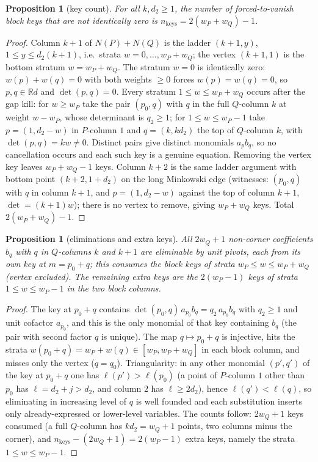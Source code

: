 \documentclass[11pt]{article}
\newtheorem{proposition}[theorem]{Proposition}
\theoremstyle{definition}
\theoremstyle{remark}
\begin{document}
\begin{proposition}[key count]\label{prop:A}
For all $k,d_2\geq 1$, the number of forced-to-vanish block keys that are not identically zero is $n_{\mathrm{keys}}=2(w_P+w_Q)-1$.
\end{proposition}

\begin{proof}
Column $k+1$ of $N(P)+N(Q)$ is the ladder $(k+1,y)$, $1\leq y\leq d_2(k+1)$, i.e.\ strata $w=0,\dots,w_P+w_Q$; the vertex $(k+1,1)$ is the bottom stratum $w=w_P+w_Q$. The stratum $w=0$ is identically zero: $w(p)+w(q)=0$ with both weights $\geq 0$ forces $w(p)=w(q)=0$, so $p,q\in\mathbb{R}d$ and $\det(p,q)=0$. Every stratum $1\leq w\leq w_P+w_Q$ occurs after the gap kill: for $w\geq w_P$ take the pair $(p_0,q)$ with $q$ in the full $Q$-column $k$ at weight $w-w_P$, whose determinant is $q_2\geq 1$; for $1\leq w\leq w_P-1$ take $p=(1,d_2-w)$ in $P$-column $1$ and $q=(k,kd_2)$ the top of $Q$-column $k$, with $\det(p,q)=kw\neq 0$. Distinct pairs give distinct monomials $a_pb_q$, so no cancellation occurs and each such key is a genuine equation. Removing the vertex key leaves $w_P+w_Q-1$ keys. Column $k+2$ is the same ladder argument with bottom point $(k+2,1+d_2)$ on the long Minkowski edge (witnesses: $(p_0,q)$ with $q$ in column $k+1$, and $p=(1,d_2-w)$ against the top of column $k+1$, $\det=(k+1)w$); there is no vertex to remove, giving $w_P+w_Q$ keys. Total $2(w_P+w_Q)-1$.
\end{proof}

\begin{proposition}[eliminations and extra keys]\label{prop:B}
All $2w_Q+1$ non-corner coefficients $b_q$ with $q$ in $Q$-columns $k$ and $k+1$ are eliminable by unit pivots, each from its own key at $m=p_0+q$; this consumes the block keys of strata $w_P\leq w\leq w_P+w_Q$ (vertex excluded). The remaining \emph{extra keys} are the $2(w_P-1)$ keys of strata $1\leq w\leq w_P-1$ in the two block columns.
\end{proposition}

\begin{proof}
The key at $p_0+q$ contains $\det(p_0,q)\,a_{p_0}b_q=q_2\,a_{p_0}b_q$ with $q_2\geq 1$ and unit cofactor $a_{p_0}$, and this is the only monomial of that key containing $b_q$ (the pair with second factor $q$ is unique). The map $q\mapsto p_0+q$ is injective, hits the strata $w(p_0+q)=w_P+w(q)\in[w_P,w_P+w_Q]$ in each block column, and misses only the vertex ($q=q_0$). Triangularity: in any other monomial $(p',q')$ of the key at $p_0+q$ one has $\ell(p')>\ell(p_0)$ (a point of $P$-column $1$ other than $p_0$ has $\ell=d_2+j>d_2$, and column $2$ has $\ell\geq 2d_2$), hence $\ell(q')<\ell(q)$, so eliminating in increasing level of $q$ is well founded and each substitution inserts only already-expressed or lower-level variables. The counts follow: $2w_Q+1$ keys consumed (a full $Q$-column has $kd_2=w_Q+1$ points, two columns minus the corner), and $n_{\mathrm{keys}}-(2w_Q+1)=2(w_P-1)$ extra keys, namely the strata $1\leq w\leq w_P-1$.
\end{proof}
\end{document}
